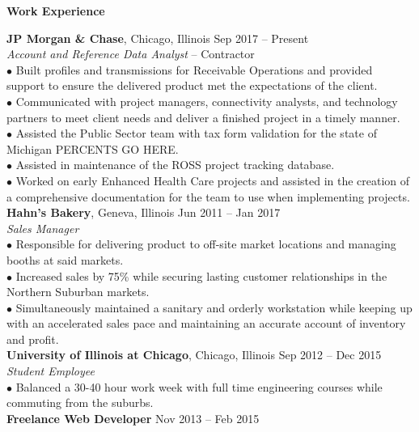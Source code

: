 \documentclass[11pt]{article}
\newcommand{\sectionheader}[1]{\noindent \textbf{\large #1}}
\newenvironment{sectionbody}{\begin{adjustwidth}{6mm}{}}{\end{adjustwidth}}
\begin{document}
\sectionheader{Work Experience}
\begin{sectionbody}
{\bf JP Morgan \& Chase}, Chicago, Illinois \hfill Sep 2017 -- Present \\
    \textit{Account and Reference Data Analyst} -- Contractor \\
$\bullet$ Built profiles and transmissions for Receivable Operations and provided support to ensure the delivered product met the expectations of the client. \\
$\bullet$ Communicated with project managers, connectivity analysts, and technology partners to meet client needs and deliver a finished project in a timely manner. \\
$\bullet$ Assisted the Public Sector team with tax form validation for the state of Michigan PERCENTS GO HERE. \\
$\bullet$ Assisted in maintenance of the ROSS project tracking database. \\
$\bullet$ Worked on early Enhanced Health Care projects and assisted in the creation of a comprehensive documentation for the team to use when implementing projects. \\
{\bf Hahn's Bakery}, Geneva, Illinois \hfill Jun 2011 -- Jan 2017 \\
\textit{Sales Manager} \\
$\bullet$ Responsible for delivering product to off-site market locations and managing booths at said markets. \\
$\bullet$ Increased sales by 75\% while securing lasting customer relationships in the Northern Suburban markets. \\
$\bullet$ Simultaneously maintained a sanitary and orderly workstation while keeping up with an accelerated sales pace and maintaining an accurate account of inventory and profit. \\
{\bf University of Illinois at Chicago}, Chicago, Illinois \hfill Sep 2012 -- Dec 2015 \\
\textit{Student Employee} \\
$\bullet$ Balanced a 30-40 hour work week with full time engineering courses while commuting from the suburbs. \\
{\bf Freelance Web Developer} \hfill Nov 2013 -- Feb 2015
\end{sectionbody}
\end{document}
